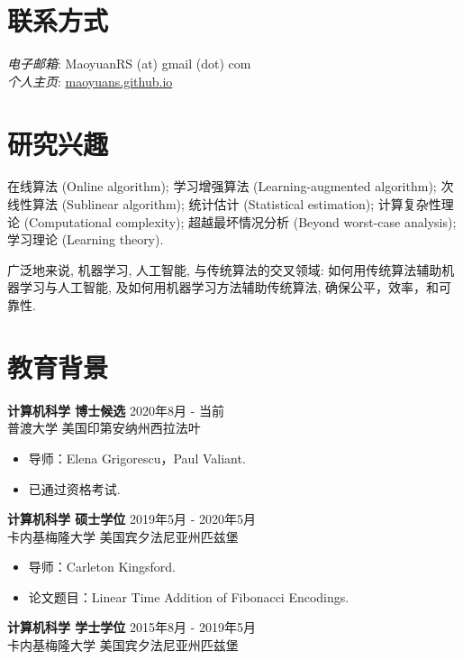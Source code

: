 \documentclass[margin, 10pt]{res} %
\begin{document}
\begin{resume}

\section{联系方式}
\emph{电子邮箱}: MaoyuanRS (at) gmail (dot) com\\
\emph{个人主页}: \href{https://maoyuans.github.io}{maoyuans.github.io}

 
\section{研究兴趣}  

在线算法 (Online algorithm); 学习增强算法 (Learning-augmented algorithm); 次线性算法 (Sublinear algorithm); 统计估计 (Statistical estimation); 计算复杂性理论 (Computational complexity); 超越最坏情况分析 (Beyond worst-case analysis); 学习理论 (Learning theory).

广泛地来说, 机器学习, 人工智能, 与传统算法的交叉领域: 如何用传统算法辅助机器学习与人工智能, 及如何用机器学习方法辅助传统算法, 确保公平，效率，和可靠性.

\section{教育背景}

{\bf 计算机科学\; 博士候选} \hfill 2020年8月 - 当前 \\
普渡大学 \hfill 美国印第安纳州西拉法叶

\begin{itemize}
\item 导师：Elena Grigorescu，Paul Valiant.
\item 已通过资格考试.
\end{itemize} 

{\bf 计算机科学\; 硕士学位} \hfill 2019年5月 - 2020年5月 \\
卡内基梅隆大学 \hfill 美国宾夕法尼亚州匹兹堡

\begin{itemize}
\item 导师：Carleton Kingsford. \hspace{-2em}
\item 论文题目：Linear Time Addition of Fibonacci Encodings.
\end{itemize} 

{\bf 计算机科学\; 学士学位} \hfill 2015年8月 - 2019年5月 \\
卡内基梅隆大学 \hfill 美国宾夕法尼亚州匹兹堡


\end{resume}
\end{document}
